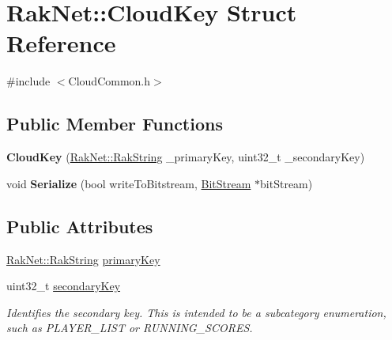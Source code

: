 \hypertarget{struct_rak_net_1_1_cloud_key}{\section{Rak\-Net\-:\-:Cloud\-Key Struct Reference}
\label{struct_rak_net_1_1_cloud_key}
}


{\ttfamily \#include $<$Cloud\-Common.\-h$>$}

\subsection*{Public Member Functions}
\begin{DoxyCompactItemize}
\item 
\hypertarget{struct_rak_net_1_1_cloud_key_a6b403feb6ae10aceb115f5ff75e848e3}{{\bfseries Cloud\-Key} (\hyperlink{class_rak_net_1_1_rak_string}{Rak\-Net\-::\-Rak\-String} \-\_\-primary\-Key, uint32\-\_\-t \-\_\-secondary\-Key)}\label{struct_rak_net_1_1_cloud_key_a6b403feb6ae10aceb115f5ff75e848e3}

\item 
\hypertarget{struct_rak_net_1_1_cloud_key_a24d7c12ae2f6bce0a90d3742f08ad56a}{void {\bfseries Serialize} (bool write\-To\-Bitstream, \hyperlink{class_rak_net_1_1_bit_stream}{Bit\-Stream} $\ast$bit\-Stream)}\label{struct_rak_net_1_1_cloud_key_a24d7c12ae2f6bce0a90d3742f08ad56a}

\end{DoxyCompactItemize}
\subsection*{Public Attributes}
\begin{DoxyCompactItemize}
\item 
\hyperlink{class_rak_net_1_1_rak_string}{Rak\-Net\-::\-Rak\-String} \hyperlink{struct_rak_net_1_1_cloud_key_a0bc4ec2feaa1e7b3ab06a0dfede65e93}{primary\-Key}
\item 
\hypertarget{struct_rak_net_1_1_cloud_key_a6817be58441ae53301f9be3c7afb72c1}{uint32\-\_\-t \hyperlink{struct_rak_net_1_1_cloud_key_a6817be58441ae53301f9be3c7afb72c1}{secondary\-Key}}\label{struct_rak_net_1_1_cloud_key_a6817be58441ae53301f9be3c7afb72c1}

\begin{DoxyCompactList}\small\item\em Identifies the secondary key. This is intended to be a subcategory enumeration, such as P\-L\-A\-Y\-E\-R\-\_\-\-L\-I\-S\-T or R\-U\-N\-N\-I\-N\-G\-\_\-\-S\-C\-O\-R\-E\-S. \end{DoxyCompactList}\end{DoxyCompactItemize}


